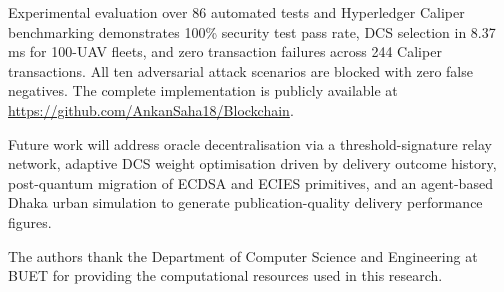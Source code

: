 \documentclass[sigplan,screen]{acmart}
\begin{document}
Experimental evaluation over 86 automated tests and Hyperledger Caliper
benchmarking demonstrates 100\% security test pass rate, DCS selection in
8.37\,ms for 100-UAV fleets, and zero transaction failures across 244
Caliper transactions.
All ten adversarial attack scenarios are blocked with zero false negatives.
The complete implementation is publicly available at
\url{https://github.com/AnkanSaha18/Blockchain}.

Future work will address oracle decentralisation via a threshold-signature
relay network, adaptive DCS weight optimisation driven by delivery outcome
history, post-quantum migration of ECDSA and ECIES primitives,
and an agent-based Dhaka urban simulation to generate publication-quality
delivery performance figures.

\begin{acks}
The authors thank the Department of Computer Science and Engineering at BUET
for providing the computational resources used in this research.
\end{acks}



\end{document}
